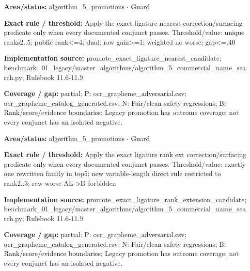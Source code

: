 \begin{tcolorbox}[enhanced,breakable,colback=white,colframe=Muted!45,boxrule=0.45pt,arc=1.5pt,left=6pt,right=6pt,top=5pt,bottom=5pt,title={\texttt{A5-PROMOTE-EXACT-LIGATURE-NEAREST}},title after break={\texttt{A5-PROMOTE-EXACT-LIGATURE-NEAREST}\ (continued)},fonttitle=\headingfont\bfseries\color{Navy},coltitle=Navy]
\textbf{Area/status:} algorithm\_\allowbreak{}5\_\allowbreak{}promotions $\boldsymbol{\cdot}$ Guard\par
\smallskip
\textbf{Exact rule / threshold:} Apply the exact ligature nearest correction/\allowbreak{}surfacing predicate only when every documented conjunct passes. Threshold/\allowbreak{}value: unique ranks2..5; public rank<=4; dual; raw gain>=1; weighted no worse; gap<=.40\par
\smallskip
\textbf{Implementation source:} promote\_\allowbreak{}exact\_\allowbreak{}ligature\_\allowbreak{}nearest\_\allowbreak{}candidate; benchmark\_\allowbreak{}01\_\allowbreak{}legacy/\allowbreak{}master\_\allowbreak{}algorithms/\allowbreak{}algorithm\_\allowbreak{}5\_\allowbreak{}commercial\_\allowbreak{}name\_\allowbreak{}search.py; Rulebook 11.6-11.9\par
\smallskip
\textbf{Coverage / gap:} partial; P: ocr\_\allowbreak{}grapheme\_\allowbreak{}adversarial.csv; ocr\_\allowbreak{}grapheme\_\allowbreak{}catalog\_\allowbreak{}generated.csv; N: Fair/\allowbreak{}clean safety regressions; B: Rank/\allowbreak{}score/\allowbreak{}evidence boundaries; Legacy promotion has outcome coverage; not every conjunct has an isolated negative.
\end{tcolorbox}
\begin{tcolorbox}[enhanced,breakable,colback=white,colframe=Muted!45,boxrule=0.45pt,arc=1.5pt,left=6pt,right=6pt,top=5pt,bottom=5pt,title={\texttt{A5-PROMOTE-EXACT-LIGATURE-RANK-EXT}},title after break={\texttt{A5-PROMOTE-EXACT-LIGATURE-RANK-EXT}\ (continued)},fonttitle=\headingfont\bfseries\color{Navy},coltitle=Navy]
\textbf{Area/status:} algorithm\_\allowbreak{}5\_\allowbreak{}promotions $\boldsymbol{\cdot}$ Guard\par
\smallskip
\textbf{Exact rule / threshold:} Apply the exact ligature rank ext correction/\allowbreak{}surfacing predicate only when every documented conjunct passes. Threshold/\allowbreak{}value: exactly one rewritten family in top5; new variable-length direct rule restricted to rank2..3; raw-worse AL->D forbidden\par
\smallskip
\textbf{Implementation source:} promote\_\allowbreak{}exact\_\allowbreak{}ligature\_\allowbreak{}rank\_\allowbreak{}extension\_\allowbreak{}candidate; benchmark\_\allowbreak{}01\_\allowbreak{}legacy/\allowbreak{}master\_\allowbreak{}algorithms/\allowbreak{}algorithm\_\allowbreak{}5\_\allowbreak{}commercial\_\allowbreak{}name\_\allowbreak{}search.py; Rulebook 11.6-11.9\par
\smallskip
\textbf{Coverage / gap:} partial; P: ocr\_\allowbreak{}grapheme\_\allowbreak{}adversarial.csv; ocr\_\allowbreak{}grapheme\_\allowbreak{}catalog\_\allowbreak{}generated.csv; N: Fair/\allowbreak{}clean safety regressions; B: Rank/\allowbreak{}score/\allowbreak{}evidence boundaries; Legacy promotion has outcome coverage; not every conjunct has an isolated negative.
\end{tcolorbox}
